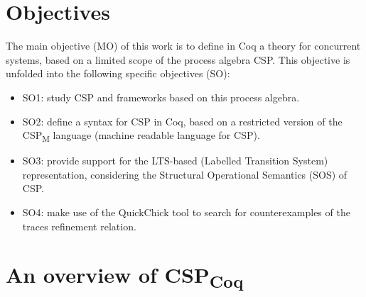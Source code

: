 \section{Objectives}

The main objective (MO) of this work is to define in Coq a theory for concurrent systems, based on a limited scope of the process algebra CSP. This objective is unfolded into the following specific objectives (SO):

\begin{itemize}  
	\item SO1: study CSP and frameworks based on this process algebra. 
	\item SO2: define a syntax for CSP in Coq, based on a restricted version of the CSP\textsubscript{M} language (machine readable language for CSP). 
	\item SO3: provide support for the LTS-based (Labelled Transition System) representation, considering the Structural Operational Semantics (SOS) of CSP.
	\item SO4: make use of the QuickChick tool to search for counterexamples of the traces refinement relation.
\end{itemize}

\section{An overview of CSP\textsubscript{Coq}}


